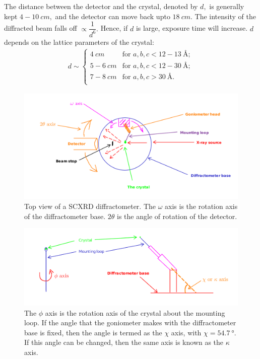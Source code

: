 The distance between the detector and the crystal, denoted by $d,$ is generally kept $4-10~\si{cm},$ and the detector can move back upto $\SI{18}{cm}.$ The intensity of the diffracted beam falls off $\propto \dfrac{1}{d^6}.$ Hence, if $d$ is large, exposure time will increase. $d$ depends on the lattice parameters of the crystal:%
%	
	\begin{subequations}
		\begin{align}
		d \sim \begin{cases}
		\SI{4}{cm} & \text{for } a, b, c < 12-13~\si{\angstrom};\\
		5-6~\si{cm} & \text{for } a, b, c < 12-30~\si{\angstrom};\\
		7-8~\si{cm} & \text{for } a, b, c > \SI{30}{\angstrom}.\\
		\end{cases}
		\end{align}
	\end{subequations}
	
\begin{figure}
	\centering
	\includegraphics[width=\textwidth]{sc_diffractometer_omega.png}
	\caption{\label{diffractometer_omega}Top view of a SCXRD diffractometer. The $\omega$ axis is the rotation axis of the diffractometer base. $2\theta$ is the angle of rotation of the detector.}
\end{figure}
	
\begin{figure}
	\centering
	\includegraphics[width=\textwidth]{sc_diffractometer_phi_chi.png}
	\caption{\label{diffractometer_phi_chi}The $\phi$ axis is the rotation axis of the crystal about the mounting loop. If the angle that the goniometer makes with the diffractometer base is fixed, then the angle is termed as the $\chi$ axis, with $\chi = \SI{54.7}{\degree}.$ If this angle can be changed, then the same axis is known as the $\kappa$ axis.}
\end{figure}

